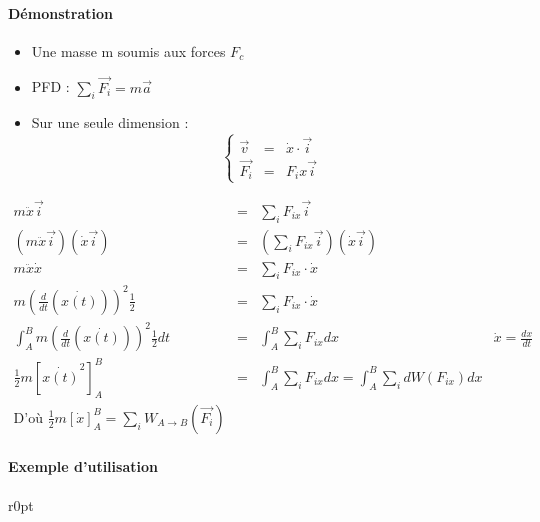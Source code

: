 \paragraph{Démonstration}
	\begin{itemize}
		\item Une masse m soumis aux forces $F_c$
		\item PFD : $\sum_i \vec{F_i} = m\vec{a}$
		\item Sur une seule dimension : \[\left\{\begin{array}{rcl}
			\vec{v} &=& \dot{x} \cdot \vec{i} \\
			\vec{F_i} &=& F_i x \vec{i}
		\end{array}\right.\]
	\end{itemize}
		\[\begin{array}{rclr}
			m\ddot{x} \vec{i} &=& \sum_i F_{ix} \vec{i} \\
			(m\ddot{x}\vec{i})(\dot{x}\vec{i}) &=& (\sum_i F_{ix} \vec{i})(\dot{x}\vec{i}) \\
			m\ddot{x}\dot{x} &=& \sum_i F_{ix} \cdot \dot{x} \\
			m(\frac{d}{dt}(\dot{x(t)}))^2 \frac{1}{2} &=& \sum_i F_{ix} \cdot \dot{x} \\
			\int_A^B m(\frac{d}{dt}(\dot{x(t)}))^2 \frac{1}{2} dt &=& \int_A^B \sum_i F_{ix} dx & \dot{x} = \frac{dx}{dt} \\
			\frac{1}{2} m [\dot{x(t)}^2]_A^B &=& \int_A^B \sum_i F_{ix} dx = \int_A^B \sum_i dW(F_{ix}) dx \\
			\text{D'où } \frac{1}{2}m [\dot{x}]^B_A = \sum_i W_{A \to B} (\vec{F_i})
		\end{array}\]

\paragraph{Exemple d'utilisation}
	\begin{wrapfigure}[5]{r}{0pt}
	\end{wrapfigure}

